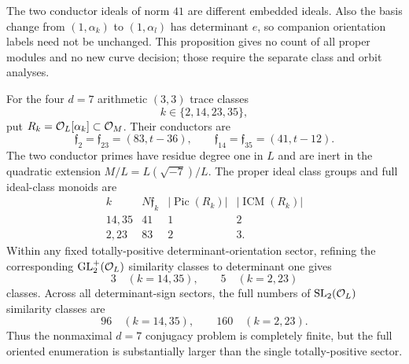 \begin{remark}
The two conductor ideals of norm $41$ are different embedded ideals.
Also the basis change from $(1,\alpha_k)$ to $(1,\alpha_l)$ has
determinant $e$, so companion orientation labels need not be unchanged.
This proposition gives no count of all proper modules and no new curve
decision; those require the separate class and orbit analyses.
\end{remark}

\begin{theorem}[Exact nonmaximal $d=7$ conjugacy counts]\label{thm:d7nonmax}
For the four $d=7$ arithmetic $(3,3)$ trace classes
\[
 k\in\{2,14,23,35\},
\]
put $R_k=\mathcal O_L[\alpha_k]\subset\mathcal O_M$.  Their conductors are
\[
 \mathfrak f_2=\mathfrak f_{23}=(83,t-36),\qquad
 \mathfrak f_{14}=\mathfrak f_{35}=(41,t-12).
\]
The two conductor primes have residue degree one in $L$ and are inert in the quadratic extension $M/L=L(\sqrt{-7})/L$.  The proper ideal class groups and full ideal-class monoids are
\[
\begin{array}{c|c|c|c}
 k & N\mathfrak f_k & |\operatorname{Pic}(R_k)| &
 |\operatorname{ICM}(R_k)|\\ \hline
 14,35&41&1&2\\
 2,23&83&2&3.
\end{array}
\]
Within any fixed totally-positive determinant-orientation sector, refining the corresponding $\mathrm{GL}_2^+(\mathcal O_L)$ similarity classes to determinant one gives
\[
 3\quad(k=14,35),\qquad 5\quad(k=2,23)
\]
classes.  Across all determinant-sign sectors, the full numbers of $\mathrm{SL}_2(\mathcal O_L)$ similarity classes are
\[
 96\quad(k=14,35),\qquad 160\quad(k=2,23).
\]
Thus the nonmaximal $d=7$ conjugacy problem is completely finite, but the full oriented enumeration is substantially larger than the single totally-positive sector.
\end{theorem}
